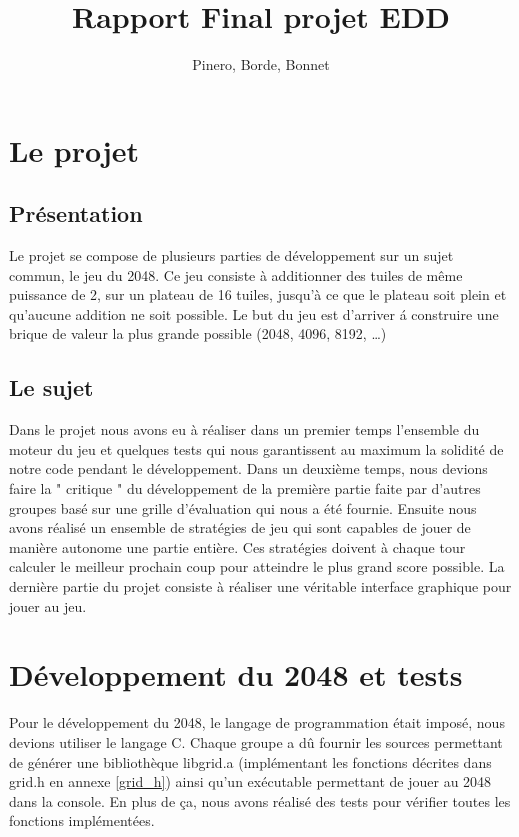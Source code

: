 \documentclass[12pt]{article}
\title{Rapport Final projet EDD}
\author{Pinero, Borde, Bonnet}
\begin{document}
\maketitle
\tableofcontents

\newpage

\section{Le projet}
\subsection{Présentation}
Le projet se compose de plusieurs parties de développement sur un sujet
commun, le jeu du 2048. Ce jeu consiste à additionner des tuiles de même
puissance de 2, sur un plateau de 16 tuiles, jusqu'à ce que le plateau soit
plein et qu'aucune addition ne soit possible. Le but du jeu est d’arriver \'a
construire une brique de valeur la plus grande possible (2048, 4096,
8192, \ldots)

\subsection{Le sujet}
Dans le projet nous avons eu à réaliser dans un premier temps l'ensemble du
moteur du jeu et quelques tests qui nous garantissent au maximum la solidité de notre code 
pendant le développement. Dans un deuxième temps, nous devions faire la
" critique " du développement de la première partie faite par
d'autres groupes basé sur une grille d'évaluation qui nous a été
fournie. Ensuite nous avons réalisé un ensemble de stratégies de jeu qui
sont capables de jouer de manière autonome une partie entière. Ces stratégies doivent à chaque tour calculer le meilleur
prochain coup pour atteindre le plus grand score possible. La dernière partie
du projet consiste à réaliser une véritable interface graphique pour
jouer au jeu.

\newpage
\section{Développement du 2048 et tests}
Pour le développement du 2048, le langage de programmation était imposé,
nous devions utiliser le langage C. Chaque groupe a dû fournir les sources
permettant de générer une bibliothèque libgrid.a (implémentant les
fonctions décrites dans grid.h en annexe \ref{grid_h}) ainsi qu’un
exécutable permettant de jouer au 2048 dans la console. En plus de ça, nous
avons réalisé des tests pour vérifier toutes les fonctions
implémentées.\par
\end{document}
